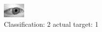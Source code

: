 \begin{figure}[h!]
\begin{center}
\includegraphics[width=0.60\columnwidth]{figures/ID2753_class_2_target_1.png}
\end{center}
\caption{ Classification: 2 actual target: 1}
\label{fig:ID2753_class_2_target_1}
\end{figure}
